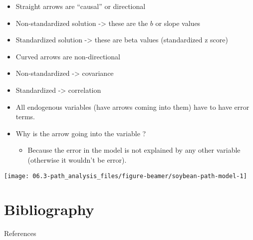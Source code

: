 \documentclass[11pt,dvipsnames,ignorenonframetext,aspectratio=169]{beamer}
\providecommand{\tightlist}{%
  \setlength{\itemsep}{0pt}\setlength{\parskip}{0pt}}
\begin{document}
\begin{frame}{}
\protect\hypertarget{section}{}
\begin{itemize}
\item
  Straight arrows are ``causal'' or directional
\item
  Non-standardized solution -\textgreater{} these are the \(b\) or slope
  values
\item
  Standardized solution -\textgreater{} these are beta values
  (standardized z score)
\item
  Curved arrows are non-directional
\item
  Non-standardized -\textgreater{} covariance
\item
  Standardized -\textgreater{} correlation
\item
  All endogenous variables (have arrows coming into them) have to have
  error terms.
\item
  Why is the arrow going into the variable ?

  \begin{itemize}
  \tightlist
  \item
    Because the error in the model is not explained by any other
    variable (otherwise it wouldn't be error).
  \end{itemize}
\end{itemize}
\end{frame}

\begin{frame}{}
\protect\hypertarget{section-1}{}
\texttt{[image: 06.3-path\_analysis\_files/figure-beamer/soybean-path-model-1]}
\end{frame}

\hypertarget{bibliography}{%
\section{Bibliography}\label{bibliography}}

\begin{frame}{References}
\protect\hypertarget{references}{}
\end{frame}
\end{document}
